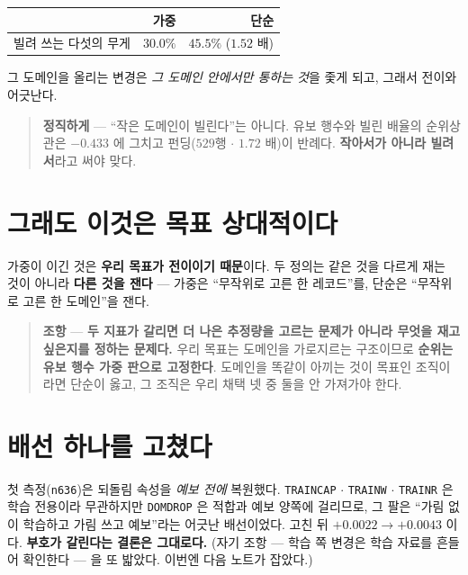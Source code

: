 \documentclass[11pt]{article}
\begin{document}
\begin{center}
\begin{tabular}{lrr}
\hline
 & 가중 & 단순 \\
\hline
빌려 쓰는 다섯의 무게 & $30.0\%$ & $\mathbf{45.5\%}$ ($1.52$ 배) \\
\hline
\end{tabular}
\end{center}

그 도메인을 올리는 변경은 \emph{그 도메인 안에서만 통하는 것}을 좇게 되고,
그래서 전이와 어긋난다.

\begin{quote}
\textbf{정직하게} --- ``작은 도메인이 빌린다''는 아니다. 유보 행수와 빌린
배율의 순위상관은 $-0.433$ 에 그치고 펀딩($529$행 $\cdot$ $1.72$ 배)이 반례다.
\textbf{작아서가 아니라 빌려서}라고 써야 맞다.
\end{quote}

\section{그래도 이것은 목표 상대적이다}

가중이 이긴 것은 \textbf{우리 목표가 전이이기 때문}이다. 두 정의는 같은 것을
다르게 재는 것이 아니라 \textbf{다른 것을 잰다} --- 가중은 ``무작위로 고른 한
레코드''를, 단순은 ``무작위로 고른 한 도메인''을 잰다.

\begin{quote}
\textbf{조항} --- \textbf{두 지표가 갈리면 더 나은 추정량을 고르는 문제가
아니라 무엇을 재고 싶은지를 정하는 문제다.} 우리 목표는 도메인을 가로지르는
구조이므로 \textbf{순위는 유보 행수 가중 판으로 고정한다}. 도메인을 똑같이
아끼는 것이 목표인 조직이라면 단순이 옳고, 그 조직은 우리 채택 넷 중 둘을
안 가져가야 한다.
\end{quote}

\section*{배선 하나를 고쳤다}

첫 측정(\texttt{n636})은 되돌림 속성을 \emph{예보 전에} 복원했다.
\texttt{TRAINCAP} $\cdot$ \texttt{TRAINW} $\cdot$ \texttt{TRAINR} 은 학습
전용이라 무관하지만 \texttt{DOMDROP} 은 적합과 예보 양쪽에 걸리므로, 그 팔은
``가림 없이 학습하고 가림 쓰고 예보''라는 어긋난 배선이었다. 고친 뒤
$+0.0022 \to +0.0043$ 이다. \textbf{부호가 갈린다는 결론은 그대로다.}
(자기 조항 --- 학습 쪽 변경은 학습 자료를 흔들어 확인한다 --- 을 또 밟았다.
이번엔 다음 노트가 잡았다.)
\end{document}
